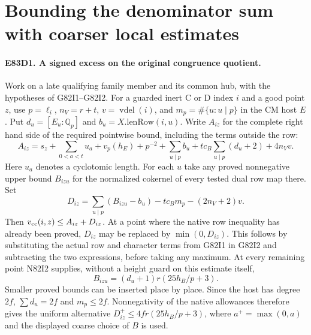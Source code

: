 \section{Bounding the denominator sum with coarser local estimates}

\paragraph{E83D1. A signed excess on the original congruence quotient.}
Work on a late qualifying family member and its common hub, with
the hypotheses of G82I1--G82I2. For a guarded inert C or D index
$i$ and a good point $z$, use $p=\ell_i$, $n_V=r+t$,
$v=\operatorname{vdel}(i)$, and $m_p=\#\{u:u\mid p\}$ in
the CM host $E$. Put $d_u=[E_u:\mathbb Q_p]$ and
$b_u=X.\mathrm{lenRow}(i,u)$. Write $A_{iz}$ for the complete
right hand side of the required pointwise bound, including the
terms outside the row:
\[
 A_{iz}=s_z+\sum_{0<a<t}u_a+v_p(h_E)+p^{-2}
     +\sum_{u\mid p}b_u+tc_B\sum_{u\mid p}(d_u+2)+4n_Vv .
\]
Here $u_a$ denotes a cyclotomic length. For each $u$ take any
proved nonnegative upper bound $B_{izu}$ for the normalized
cokernel of every tested dual row map there. Set
\[
 D_{iz}=\sum_{u\mid p}(B_{izu}-b_u)-tc_Bm_p-(2n_V+2)v.
\]
Then $v_{\rm cc}(i,z)\le A_{iz}+D_{iz}$. At a point where the
native row inequality has already been proved, $D_{iz}$ may be
replaced by $\min(0,D_{iz})$. This follows by substituting the
actual row and character terms from G82I1 in G82I2 and
subtracting the two expressions, before taking any maximum.
At every remaining point N82I2 supplies, without a height guard
on this estimate itself,
\[
 B_{izu}=(d_u+1)r(25h_B/p+3).
\]
Smaller proved bounds can be inserted place by place. Since the
host has degree $2f$, $\sum d_u=2f$ and $m_p\le2f$.
Nonnegativity of the native allowances therefore gives the
uniform alternative $D_{iz}^+\le4fr(25h_B/p+3)$, where
$a^+=\max(0,a)$ and the displayed coarse choice of $B$ is used.


